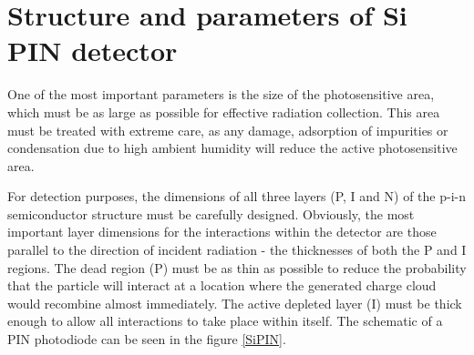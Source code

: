 \section{Structure and parameters of Si PIN detector}
One of the most important parameters is the size of the photosensitive area, which must be as large as possible for effective radiation collection. This area must be treated with extreme care, as any damage, adsorption of impurities or condensation due to high ambient humidity will reduce the active photosensitive area.
\par
For detection purposes, the dimensions of all three layers (P, I and N) of the p-i-n semiconductor structure must be carefully designed. 
Obviously, the most important layer dimensions for the interactions within the detector are those parallel to the direction of incident radiation - the thicknesses of both the P and I regions.
The dead region (P) must be as thin as possible to reduce the probability that the particle will interact at a location where the generated charge cloud would recombine almost immediately. The active depleted layer (I) must be thick enough to allow all interactions to take place within itself. The schematic of a PIN photodiode can be seen in the figure \ref{SiPIN}.
%



